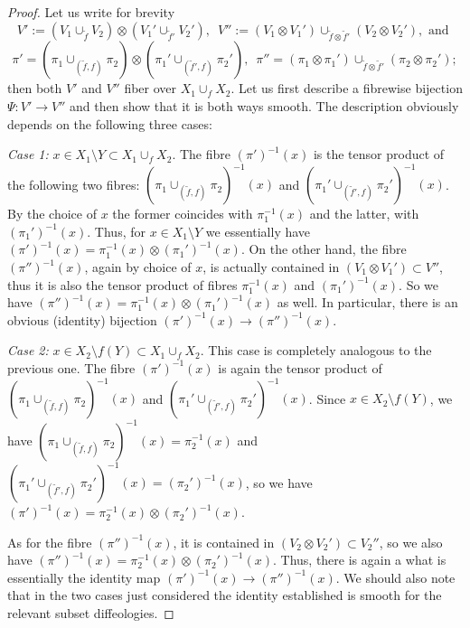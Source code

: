 \documentclass{article}
\begin{document}
\begin{proof}
Let us write for brevity
$$V':=(V_1\cup_{\tilde{f}}V_2)\otimes(V_1'\cup_{\tilde{f}'}V_2'),\,\,\,V'':=(V_1\otimes V_1')\cup_{\tilde{f}\otimes\tilde{f}'}(V_2\otimes V_2'),\mbox{ and }$$
$$\pi'=(\pi_1\cup_{(\tilde{f},f)}\pi_2)\otimes(\pi_1'\cup_{(\tilde{f}',f)}\pi_2'),\,\,\,\pi''=(\pi_1\otimes\pi_1')\cup_{\tilde{f}\otimes\tilde{f}'}(\pi_2\otimes\pi_2');$$ then both $V'$ and $V''$ fiber over $X_1\cup_f X_2$. Let 
us first describe a fibrewise bijection $\Psi:V'\to V''$ and then show that it is both ways smooth. The description obviously depends on the following three cases:\vspace{2mm}

\noindent\emph{Case 1:} $x\in X_1\setminus Y\subset X_1\cup_f X_2$. The fibre $(\pi')^{-1}(x)$ is the tensor product of the following two fibres: $(\pi_1\cup_{(\tilde{f},f)}\pi_2)^{-1}(x)$ and
$(\pi_1'\cup_{(\tilde{f}',f)}\pi_2')^{-1}(x)$. By the choice of $x$ the former coincides with $\pi_1^{-1}(x)$ and the latter, with $(\pi_1')^{-1}(x)$. Thus, for $x\in X_1\setminus Y$ we essentially have 
$(\pi')^{-1}(x)=\pi_1^{-1}(x)\otimes(\pi_1')^{-1}(x)$. On the other hand, the fibre $(\pi'')^{-1}(x)$, again by choice of $x$, is actually contained in $(V_1\otimes V_1')\subset V''$, thus it is also the tensor product 
of fibres $\pi_1^{-1}(x)$ and $(\pi_1')^{-1}(x)$. So we have $(\pi'')^{-1}(x)=\pi_1^{-1}(x)\otimes(\pi_1')^{-1}(x)$ as well. In particular, there is an obvious (identity) bijection $(\pi')^{-1}(x)\to(\pi'')^{-1}(x)$.
\vspace{2mm}

\noindent\emph{Case 2:}  $x\in X_2\setminus f(Y)\subset X_1\cup_f X_2$. This case is completely analogous to the previous one. The fibre $(\pi')^{-1}(x)$ is again the tensor product of
$(\pi_1\cup_{(\tilde{f},f)}\pi_2)^{-1}(x)$ and $(\pi_1'\cup_{(\tilde{f}',f)}\pi_2')^{-1}(x)$. Since $x\in X_2\setminus f(Y)$, we have $(\pi_1\cup_{(\tilde{f},f)}\pi_2)^{-1}(x)=\pi_2^{-1}(x)$ and
$(\pi_1'\cup_{(\tilde{f}',f)}\pi_2')^{-1}(x)=(\pi_2')^{-1}(x)$, so we have $(\pi')^{-1}(x)=\pi_2^{-1}(x)\otimes(\pi_2')^{-1}(x)$.

As for the fibre $(\pi'')^{-1}(x)$, it is contained in $(V_2\otimes V_2')\subset V_2''$, so we also have $(\pi'')^{-1}(x)=\pi_2^{-1}(x)\otimes(\pi_2')^{-1}(x)$. Thus, there is again a what is essentially the identity map
$(\pi')^{-1}(x)\to(\pi'')^{-1}(x)$. We should also note that in the two cases just considered the identity established is smooth for the relevant subset diffeologies.\vspace{2mm}


\end{proof}
\end{document}
